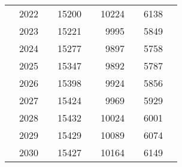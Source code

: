 \begin{table}
\begin{tabular}[t]{>{}l|l>{}rr>{}r|rrrr}
 & 2022 & \cellcolor[HTML]{858379}{\textcolor{white}{700}} & 15200 & \cellcolor[HTML]{44BF70}{\textcolor{white}{0.299}} & 10224 & \cellcolor[HTML]{25AB82}{\textcolor{white}{0.387}} & 6138 & \cellcolor[HTML]{23A983}{\textcolor{white}{0.397}}\\

 & 2023 & \cellcolor[HTML]{B0A473}{\textcolor{white}{633}} & 15221 & \cellcolor[HTML]{44BF70}{\textcolor{white}{0.299}} & 9995 & \cellcolor[HTML]{27AD81}{\textcolor{white}{0.378}} & 5849 & \cellcolor[HTML]{27AD81}{\textcolor{white}{0.378}}\\

 & 2024 & \cellcolor[HTML]{AFA473}{\textcolor{white}{634}} & 15277 & \cellcolor[HTML]{42BE71}{\textcolor{white}{0.300}} & 9897 & \cellcolor[HTML]{28AE80}{\textcolor{white}{0.374}} & 5758 & \cellcolor[HTML]{28AE80}{\textcolor{white}{0.372}}\\

 & 2025 & \cellcolor[HTML]{9F9777}{\textcolor{white}{658}} & 15347 & \cellcolor[HTML]{42BE71}{\textcolor{white}{0.302}} & 9892 & \cellcolor[HTML]{28AE80}{\textcolor{white}{0.374}} & 5787 & \cellcolor[HTML]{28AE80}{\textcolor{white}{0.374}}\\

 & 2026 & \cellcolor[HTML]{918C78}{\textcolor{white}{681}} & 15398 & \cellcolor[HTML]{42BE71}{\textcolor{white}{0.303}} & 9924 & \cellcolor[HTML]{27AD81}{\textcolor{white}{0.375}} & 5856 & \cellcolor[HTML]{26AD81}{\textcolor{white}{0.379}}\\

 & 2027 & \cellcolor[HTML]{888579}{\textcolor{white}{696}} & 15424 & \cellcolor[HTML]{42BE71}{\textcolor{white}{0.303}} & 9969 & \cellcolor[HTML]{27AD81}{\textcolor{white}{0.377}} & 5929 & \cellcolor[HTML]{25AC82}{\textcolor{white}{0.383}}\\

 & 2028 & \cellcolor[HTML]{848279}{\textcolor{white}{702}} & 15432 & \cellcolor[HTML]{42BE71}{\textcolor{white}{0.303}} & 10024 & \cellcolor[HTML]{26AD81}{\textcolor{white}{0.379}} & 6001 & \cellcolor[HTML]{25AB82}{\textcolor{white}{0.388}}\\

 & 2029 & \cellcolor[HTML]{848179}{\textcolor{white}{703}} & 15429 & \cellcolor[HTML]{42BE71}{\textcolor{white}{0.303}} & 10089 & \cellcolor[HTML]{26AD81}{\textcolor{white}{0.382}} & 6074 & \cellcolor[HTML]{24AA83}{\textcolor{white}{0.393}}\\

 & 2030 & \cellcolor[HTML]{858379}{\textcolor{white}{700}} & 15427 & \cellcolor[HTML]{42BE71}{\textcolor{white}{0.303}} & 10164 & \cellcolor[HTML]{25AC82}{\textcolor{white}{0.384}} & 6149 & \cellcolor[HTML]{23A983}{\textcolor{white}{0.397}}\\


\end{tabular}
\end{table}
